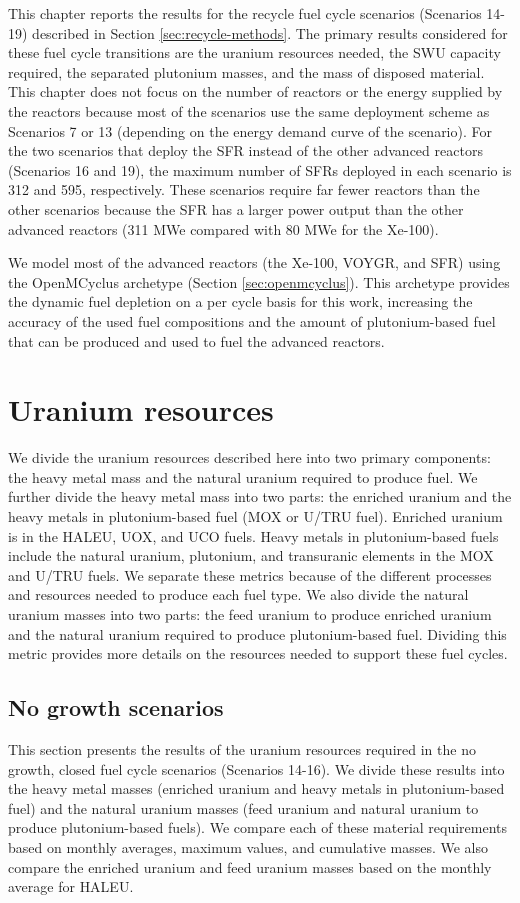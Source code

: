 This chapter reports the results for the recycle fuel cycle 
scenarios (Scenarios 14-19) described 
in Section \ref{sec:recycle-methods}. The primary results considered 
for these fuel cycle transitions are the uranium resources needed, 
the \gls{SWU} capacity required, the separated plutonium masses, 
and the mass of disposed material. This chapter does not focus 
on the number of reactors or the energy supplied by 
the reactors because most of the scenarios use the same 
deployment scheme as Scenarios 7 or 13 (depending on 
the energy demand curve of the scenario). For the two 
scenarios that deploy the \gls{SFR} instead of the other 
advanced reactors (Scenarios 16 and 19), the maximum number 
of \glspl{SFR} deployed in each scenario is 312 and 595, 
respectively. 
These scenarios require far fewer reactors than the other scenarios 
because the \gls{SFR} has a larger power output than the other 
advanced reactors (311 MWe compared with 80 MWe for the Xe-100).

We model most of the advanced reactors (the Xe-100, VOYGR, and 
\gls{SFR}) using the OpenMCyclus archetype (Section 
\ref{sec:openmcyclus}). This archetype provides the dynamic 
fuel depletion on a per cycle basis for this work, increasing 
the accuracy of the used fuel compositions and the amount of 
plutonium-based fuel that can be produced and used to fuel the 
advanced reactors. 

\section{Uranium resources}
We divide the uranium resources described here into two primary 
components: the heavy metal mass and the natural uranium 
required to produce fuel. We further divide the heavy metal 
mass into two parts: the enriched uranium and the 
heavy metals in plutonium-based fuel (\gls{MOX} or U/TRU fuel). 
Enriched uranium is in the 
\gls{HALEU}, \gls{UOX}, and UCO fuels. Heavy metals in plutonium-based 
fuels include the natural uranium, plutonium, and transuranic 
elements in 
the \gls{MOX} and U/TRU fuels. We separate these metrics 
because of the different processes and resources needed to 
produce each fuel type. We also divide the natural uranium 
masses into two parts: the feed uranium to produce enriched uranium 
and the natural uranium required to produce 
plutonium-based fuel. Dividing this metric provides more details 
on the resources needed to support these fuel cycles. 

\subsection{No growth scenarios}
This section presents the results of the uranium resources required 
in the no growth, closed fuel cycle scenarios (Scenarios 14-16). 
We divide these results into the heavy metal masses (enriched uranium 
and heavy metals in plutonium-based fuel) and the natural 
uranium masses (feed uranium and natural uranium to produce 
plutonium-based fuels). We compare each of these material requirements 
based on monthly averages, maximum values, 
and cumulative masses. We also compare the enriched uranium and feed uranium 
masses based on the monthly average for \gls{HALEU}. 

